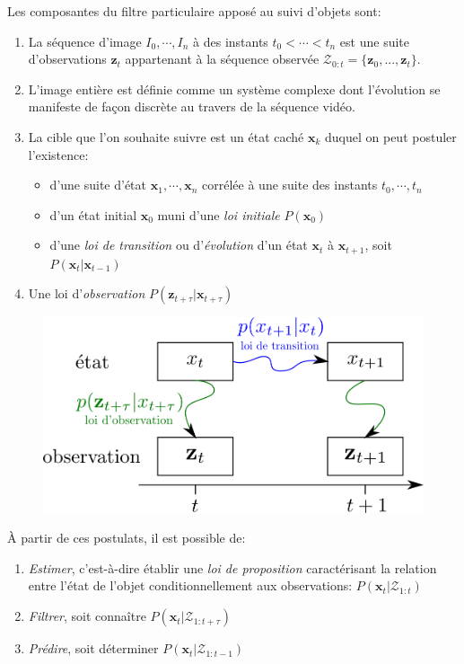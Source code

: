 \documentclass[a4paper,12pt]{report}
\begin{document}
Les composantes du filtre particulaire apposé au suivi d'objets sont:
\begin{enumerate}
\item La séquence d'image $I_0,\cdots,I_n$ à des instants $t_0<\cdots<t_n$ est une suite d'observations $\mathbf{z}_t$ appartenant à la séquence observée $ \mathcal{Z}_{0:t}=\{\mathbf{z}_0,...,\mathbf{z}_t\}$.
\item[] L'image entière est définie comme un système complexe dont l'évolution se manifeste de façon discrète au travers de la séquence vidéo.
\item La cible que l'on souhaite suivre est un état caché $\mathbf{x}_k$ duquel on peut postuler l'existence:
	\begin{itemize}
	\item d'une suite d'état $\mathbf{x}_1,\cdots,\mathbf{x}_n$ corrélée à une suite des instants $t_0,\cdots,t_n$ 
	\item d'un état initial $\mathbf{x}_0$ muni d'une \textit{loi initiale}  $P(\mathbf{x}_0)$
	\item d'une \textit{loi de transition} ou d'\textit{évolution} d'un état $\mathbf{x}_t$ à $\mathbf{x}_{t+1}$, soit $P(\mathbf{x}_t|\mathbf{x}_{t-1})$
\end{itemize}
\item Une loi d'\textit{observation} $P(\mathbf{z}_{t+\tau}|\mathbf{x}_{t+\tau})$\\
\end{enumerate}

\begin{figure}[H]
\centering
\includegraphics[scale=0.5]{figureCondensationLois.png}
\end{figure}

À partir de ces postulats, il est possible de:
\begin{enumerate}
\item \textit{Estimer}, c'est-à-dire établir une \textit{loi de proposition} caractérisant la relation entre l'état de l'objet conditionnellement aux observations: $P(\mathbf{x}_t|\mathcal{Z}_{1:t})$
\item \textit{Filtrer}, soit connaître $P(\mathbf{x}_t|\mathcal{Z}_{1:t+\tau})$
\item \textit{Prédire}, soit déterminer $P(\mathbf{x}_t|\mathcal{Z}_{1:t-1})$\\
\end{enumerate}
\end{document}
